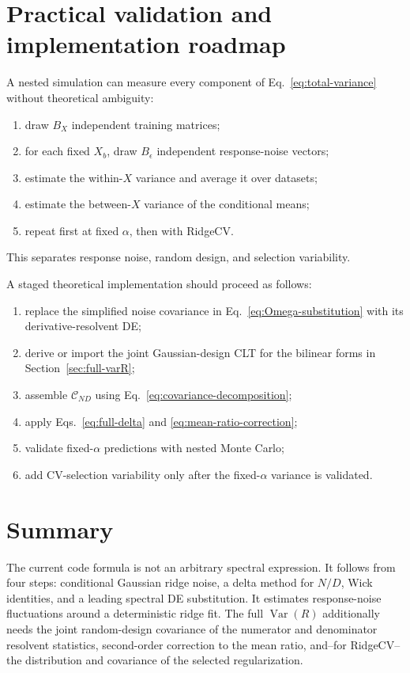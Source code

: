 \documentclass[11pt]{article}
\newcommand{\Var}{\operatorname{Var}}
\begin{document}
\section{Practical validation and implementation roadmap}

A nested simulation can measure every component of
Eq.~\eqref{eq:total-variance} without theoretical ambiguity:
\begin{enumerate}
  \item draw \(B_X\) independent training matrices;
  \item for each fixed \(X_b\), draw \(B_\epsilon\) independent response-noise
        vectors;
  \item estimate the within-\(X\) variance and average it over datasets;
  \item estimate the between-\(X\) variance of the conditional means;
  \item repeat first at fixed \(\alpha\), then with RidgeCV.
\end{enumerate}
This separates response noise, random design, and selection variability.

A staged theoretical implementation should proceed as follows:
\begin{enumerate}
  \item replace the simplified noise covariance in
        Eq.~\eqref{eq:Omega-substitution} with its derivative-resolvent DE;
  \item derive or import the joint Gaussian-design CLT for the bilinear forms
        in Section~\ref{sec:full-varR};
  \item assemble \(\mathcal C_{ND}\) using
        Eq.~\eqref{eq:covariance-decomposition};
  \item apply Eqs.~\eqref{eq:full-delta} and
        \eqref{eq:mean-ratio-correction};
  \item validate fixed-\(\alpha\) predictions with nested Monte Carlo;
  \item add CV-selection variability only after the fixed-\(\alpha\) variance
        is validated.
\end{enumerate}

\section{Summary}

The current code formula is not an arbitrary spectral expression.  It follows
from four steps: conditional Gaussian ridge noise, a delta method for \(N/D\),
Wick identities, and a leading spectral DE substitution.
It estimates response-noise fluctuations around a deterministic ridge fit.
The full \(\Var(R)\) additionally needs the joint random-design covariance of
the numerator and denominator resolvent statistics, second-order correction
to the mean ratio, and--for RidgeCV--the distribution and covariance of the
selected regularization.
\end{document}
